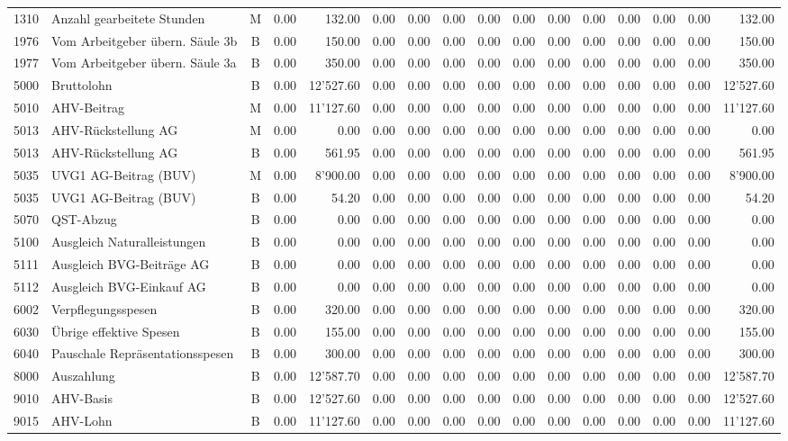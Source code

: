 \documentclass[8pt,a4paper]{extarticle}
\begin{document}
\begin{longtable}{@{\extracolsep{\fill}} !{\vrule width -1pt}l !{\vrule width -5pt}l c r r r r !{\vrule width -1pt}r !{\vrule width -1pt}r !{\vrule width -1pt}r r r r r r r}
1310&Anzahl gearbeitete Stunden&M&0.00&132.00&0.00&0.00&0.00&0.00&0.00&0.00&0.00&0.00&0.00&0.00&132.00\\
1976&Vom Arbeitgeber übern. Säule 3b&B&0.00&150.00&0.00&0.00&0.00&0.00&0.00&0.00&0.00&0.00&0.00&0.00&150.00\\
1977&Vom Arbeitgeber übern. Säule 3a&B&0.00&350.00&0.00&0.00&0.00&0.00&0.00&0.00&0.00&0.00&0.00&0.00&350.00\\
5000&Bruttolohn&B&0.00&12'527.60&0.00&0.00&0.00&0.00&0.00&0.00&0.00&0.00&0.00&0.00&12'527.60\\
5010&AHV-Beitrag&M&0.00&11'127.60&0.00&0.00&0.00&0.00&0.00&0.00&0.00&0.00&0.00&0.00&11'127.60\\
5013&AHV-Rückstellung AG&M&0.00&0.00&0.00&0.00&0.00&0.00&0.00&0.00&0.00&0.00&0.00&0.00&0.00\\
5013&AHV-Rückstellung AG&B&0.00&561.95&0.00&0.00&0.00&0.00&0.00&0.00&0.00&0.00&0.00&0.00&561.95\\
5035&UVG1 AG-Beitrag (BUV)&M&0.00&8'900.00&0.00&0.00&0.00&0.00&0.00&0.00&0.00&0.00&0.00&0.00&8'900.00\\
5035&UVG1 AG-Beitrag (BUV)&B&0.00&54.20&0.00&0.00&0.00&0.00&0.00&0.00&0.00&0.00&0.00&0.00&54.20\\
5070&QST-Abzug&B&0.00&0.00&0.00&0.00&0.00&0.00&0.00&0.00&0.00&0.00&0.00&0.00&0.00\\
5100&Ausgleich Naturalleistungen&B&0.00&0.00&0.00&0.00&0.00&0.00&0.00&0.00&0.00&0.00&0.00&0.00&0.00\\
5111&Ausgleich BVG-Beiträge AG&B&0.00&0.00&0.00&0.00&0.00&0.00&0.00&0.00&0.00&0.00&0.00&0.00&0.00\\
5112&Ausgleich BVG-Einkauf AG&B&0.00&0.00&0.00&0.00&0.00&0.00&0.00&0.00&0.00&0.00&0.00&0.00&0.00\\
6002&Verpflegungsspesen&B&0.00&320.00&0.00&0.00&0.00&0.00&0.00&0.00&0.00&0.00&0.00&0.00&320.00\\
6030&Übrige effektive Spesen&B&0.00&155.00&0.00&0.00&0.00&0.00&0.00&0.00&0.00&0.00&0.00&0.00&155.00\\
6040&Pauschale Repräsentationsspesen&B&0.00&300.00&0.00&0.00&0.00&0.00&0.00&0.00&0.00&0.00&0.00&0.00&300.00\\
8000&Auszahlung&B&0.00&12'587.70&0.00&0.00&0.00&0.00&0.00&0.00&0.00&0.00&0.00&0.00&12'587.70\\
9010&AHV-Basis&B&0.00&12'527.60&0.00&0.00&0.00&0.00&0.00&0.00&0.00&0.00&0.00&0.00&12'527.60\\
9015&AHV-Lohn&B&0.00&11'127.60&0.00&0.00&0.00&0.00&0.00&0.00&0.00&0.00&0.00&0.00&11'127.60\\

\end{longtable}
\end{document}
